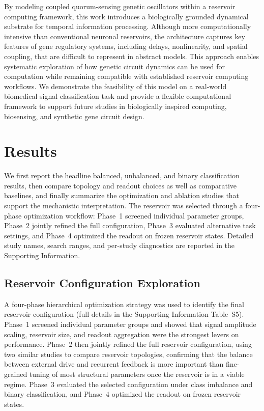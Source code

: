 \documentclass[journal=asbcd6,manuscript=article,keywords]{achemso}
\begin{document}
By modeling coupled quorum-sensing genetic oscillators within a reservoir computing framework, this work introduces a biologically grounded dynamical substrate for temporal information processing. 
Although more computationally intensive than conventional neuronal reservoirs, the architecture captures key features of gene regulatory systems, including delays, nonlinearity, and spatial coupling, that are difficult to represent in abstract models. 
This approach enables systematic exploration of how genetic circuit dynamics can be used for computation while remaining compatible with established reservoir computing workflows. 
We demonstrate the feasibility of this model on a real-world biomedical signal classification task and provide a flexible computational framework to support future studies in biologically inspired computing, biosensing, and synthetic gene circuit design.

\section{Results}
We first report the headline balanced, unbalanced, and binary classification results, then compare topology and readout choices as well as comparative baselines, and finally summarize the optimization and ablation studies that support the mechanistic interpretation. 
The reservoir was selected through a four-phase optimization workflow: Phase~1 screened individual parameter groups, Phase~2 jointly refined the full configuration, Phase~3 evaluated alternative task settings, and Phase~4 optimized the readout on frozen reservoir states. 
Detailed study names, search ranges, and per-study diagnostics are reported in the Supporting Information.

\subsection{Reservoir Configuration Exploration}

A four-phase hierarchical optimization strategy was used to identify the final reservoir configuration (full details in the Supporting Information Table~S5). 
Phase~1 screened individual parameter groups and showed that signal amplitude scaling, reservoir size, and readout aggregation were the strongest levers on performance. 
Phase~2 then jointly refined the full reservoir configuration, using two similar studies to compare reservoir topologies, confirming that the balance between external drive and recurrent feedback is more important than fine-grained tuning of most structural parameters once the reservoir is in a viable regime. 
Phase~3 evaluated the selected configuration under class imbalance and binary classification, and Phase~4 optimized the readout on frozen reservoir states. 
\end{document}
